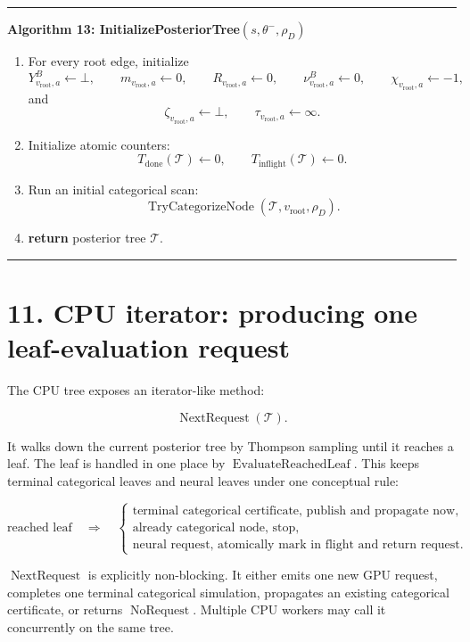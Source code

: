 \documentclass[11pt]{article}
\newcommand{\Tree}{\mathcal{T}}
\newcommand{\EvaluateReachedLeaf}{\operatorname{EvaluateReachedLeaf}}
\newcommand{\NextRequest}{\operatorname{NextRequest}}
\newcommand{\NoRequest}{\operatorname{NoRequest}}
\newcommand{\TryCategorizeNode}{\operatorname{TryCategorizeNode}}
\newenvironment{algorithmblock}[1]
{
  \par\medskip
  \noindent\hrule\par\smallskip
  \noindent\textbf{#1}
  \par\smallskip
}
{
  \par\smallskip\noindent\hrule\par\medskip
}
\newcommand{\Return}{\textbf{return }}
\begin{document}
\begin{algorithmblock}{Algorithm 13: InitializePosteriorTree\((s,\theta^-,\rho_D)\)}
\begin{enumerate}[leftmargin=2em]
  \item For every root edge, initialize
  \[
  Y^B_{v_{\mathrm{root}},a}\gets \bot,
  \qquad
  m_{v_{\mathrm{root}},a}\gets 0,
  \qquad
  R_{v_{\mathrm{root}},a}\gets 0,
  \qquad
  \nu^B_{v_{\mathrm{root}},a}\gets 0,
  \qquad
  \chi_{v_{\mathrm{root}},a}\gets -1,
  \]
  and
  \[
  \zeta_{v_{\mathrm{root}},a}\gets\bot,
  \qquad
  \tau_{v_{\mathrm{root}},a}\gets\infty.
  \]

  \item Initialize atomic counters:
  \[
  T_{\mathrm{done}}(\Tree) \gets 0,
  \qquad
  T_{\mathrm{inflight}}(\Tree) \gets 0.
  \]

  \item Run an initial categorical scan:
  \[
  \TryCategorizeNode(\Tree,v_{\mathrm{root}},\rho_D).
  \]

  \item \Return posterior tree \(\Tree\).
\end{enumerate}

\end{algorithmblock}

\section*{11. CPU iterator: producing one leaf-evaluation request}

The CPU tree exposes an iterator-like method:

\[
\NextRequest(\Tree).
\]

It walks down the current posterior tree by Thompson sampling until it reaches a
leaf. The leaf is handled in one place by \(\EvaluateReachedLeaf\). This keeps
terminal categorical leaves and neural leaves under one conceptual rule:

\[
\text{reached leaf}
\quad\Longrightarrow\quad
\begin{cases}
\text{terminal categorical certificate, publish and propagate now},\\
\text{already categorical node, stop},\\
\text{neural request, atomically mark in flight and return request}.
\end{cases}
\]

\(\NextRequest\) is explicitly non-blocking. It either emits one new GPU
request, completes one terminal categorical simulation, propagates an existing
categorical certificate, or returns \(\NoRequest\). Multiple CPU workers may call
it concurrently on the same tree.
\end{document}
